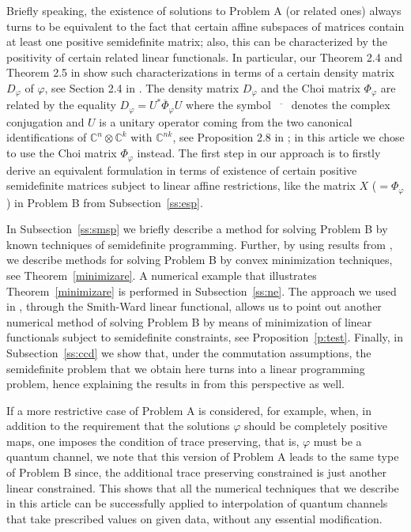 \documentclass[12pt]{amsart}
\theoremstyle{definition}
\let\phi=\varphi
\begin{document}
Briefly speaking, the existence of solutions to Problem A (or related ones)  
always turns to be equivalent to the fact that
 certain affine subspaces of matrices contain at least 
one positive semidefinite matrix; also, this can be characterized  by the positivity 
of certain related linear functionals. 
In particular, our Theorem 2.4 and Theorem 2.5 in  
\cite{prima} show such  characterizations  
in terms of a certain density matrix $D_\varphi$ of $\varphi$, see Section 2.4 in 
\cite{prima}.
The density matrix  $D_\varphi$ and the Choi matrix
 $\Phi_\varphi$ are related by the equality 
 $D_\varphi =U^*\overline{\Phi}_\varphi U$ where the symbol
 $\overline{\mbox{ }^{\mbox{ }}}$ denotes the complex conjugation 
and $U$ is a  unitary operator  coming from the two canonical identifications 
of  $\mathbb{C}^n \otimes \mathbb{C}^k$ with $\mathbb{C}^{nk}$, see 
Proposition 2.8 in \cite{prima}; 
in this article we chose to use the Choi matrix $\Phi_\varphi$ instead. 
The first step in our approach is to firstly derive an equivalent formulation in 
terms of existence of certain positive 
semidefinite matrices subject to linear affine restrictions, like the matrix $X$  
($ = \Phi_\varphi$) in Problem B from Subsection~\ref{ss:esp}.

In Subsection~\ref{ss:smsp} we briefly describe a method for solving Problem B
by known techniques of semidefinite programming. 
Further, by using results from
\cite{ca}, we describe methods for solving Problem B by convex 
minimization techniques, see Theorem~\ref{minimizare}. A numerical example that
illustrates Theorem~\ref{minimizare} is performed in Subsection~\ref{ss:ne}. 
The approach we used in \cite{prima}, through the Smith-Ward linear functional, 
allows us to point out another numerical method of solving Problem B by means 
of minimization of linear functionals subject to semidefinite constraints, see 
Proposition~\ref{p:test}. Finally, in Subsection~\ref{ss:ccd} we show that, under
the commutation assumptions, the semidefinite problem that we obtain here turns 
into a linear programming problem, hence explaining the results in \cite{LiPoon}
from this perspective as well.

If a more restrictive case of 
Problem A is considered, for example, when, in addition to the 
requirement that the 
solutions $\phi$ should be completely positive maps, one imposes the condition of
trace preserving, that is, $\phi$ must be a quantum channel, we note that this
version of Problem A leads to the same type of Problem B since, 
the additional trace preserving constrained is just another linear constrained. This
shows that all the numerical techniques that we describe in this article 
can be successfully applied to interpolation of quantum 
channels that take prescribed values on given data, without any 
essential modification.
\end{document}
